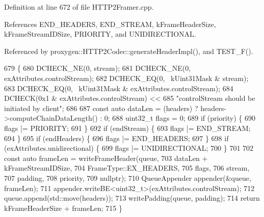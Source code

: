 Definition at line 672 of file H\+T\+T\+P2\+Framer.\+cpp.



References E\+N\+D\+\_\+\+H\+E\+A\+D\+E\+RS, E\+N\+D\+\_\+\+S\+T\+R\+E\+AM, k\+Frame\+Header\+Size, k\+Frame\+Stream\+I\+D\+Size, P\+R\+I\+O\+R\+I\+TY, and U\+N\+I\+D\+I\+R\+E\+C\+T\+I\+O\+N\+AL.



Referenced by proxygen\+::\+H\+T\+T\+P2\+Codec\+::generate\+Header\+Impl(), and T\+E\+S\+T\+\_\+\+F().


\begin{DoxyCode}
679                                          \{
680   DCHECK\_NE(0, stream);
681   DCHECK\_NE(0, exAttributes.controlStream);
682   DCHECK\_EQ(0, ~kUint31Mask & stream);
683   DCHECK\_EQ(0, ~kUint31Mask & exAttributes.controlStream);
684   DCHECK(0x1 & exAttributes.controlStream) <<
685     \textcolor{stringliteral}{"controlStream should be initiated by client"};
686 
687   \textcolor{keyword}{const} \textcolor{keyword}{auto} dataLen = (headers) ? headers->computeChainDataLength() : 0;
688   uint32\_t flags = 0;
689   \textcolor{keywordflow}{if} (priority) \{
690     flags |= PRIORITY;
691   \}
692   \textcolor{keywordflow}{if} (endStream) \{
693     flags |= END_STREAM;
694   \}
695   \textcolor{keywordflow}{if} (endHeaders) \{
696     flags |= END_HEADERS;
697   \}
698   \textcolor{keywordflow}{if} (exAttributes.unidirectional) \{
699     flags |= UNIDIRECTIONAL;
700   \}
701 
702   \textcolor{keyword}{const} \textcolor{keyword}{auto} frameLen = writeFrameHeader(queue,
703                                          dataLen + kFrameStreamIDSize,
704                                          FrameType::EX\_HEADERS,
705                                          flags,
706                                          stream,
707                                          padding,
708                                          priority,
709                                          \textcolor{keyword}{nullptr});
710   QueueAppender appender(&queue, frameLen);
711   appender.writeBE<uint32\_t>(exAttributes.controlStream);
712   queue.append(std::move(headers));
713   writePadding(queue, padding);
714   \textcolor{keywordflow}{return} kFrameHeaderSize + frameLen;
715 \}
\end{DoxyCode}
